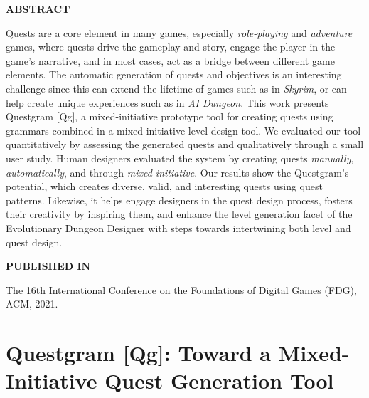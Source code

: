 \graphicspath{{included-papers-tex/paper-6/}}



\normalfont
\textbf{\textsc{ABSTRACT}}

Quests are a core element in many games, especially \emph{role-playing} and \emph{adventure} games, where quests drive the gameplay and story, engage the player in the game’s narrative, and in most cases, act as a bridge between different game elements. The automatic generation of quests and objectives is an interesting challenge since this can extend the lifetime of games such as in \emph{Skyrim}, or can help create unique experiences such as in \emph{AI Dungeon}. This work presents Questgram [Qg], a mixed-initiative prototype tool for creating quests using grammars combined in a mixed-initiative level design tool. We evaluated our tool quantitatively by assessing the generated quests and qualitatively through a small user study. Human designers evaluated the system by creating quests \emph{manually}, \emph{automatically}, and through \emph{mixed-initiative}. Our results show the Questgram's potential, which creates diverse, valid, and interesting quests using quest patterns. Likewise, it helps engage designers in the quest design process, fosters their creativity by inspiring them, and enhance the level generation facet of the Evolutionary Dungeon Designer with steps towards intertwining both level and quest design.

\textbf{\textsc{PUBLISHED IN}}

The 16th International Conference on the Foundations of Digital Games (FDG), ACM, 2021.

\section*{Questgram [Qg]: Toward a Mixed-Initiative Quest Generation Tool}




% 

% 


